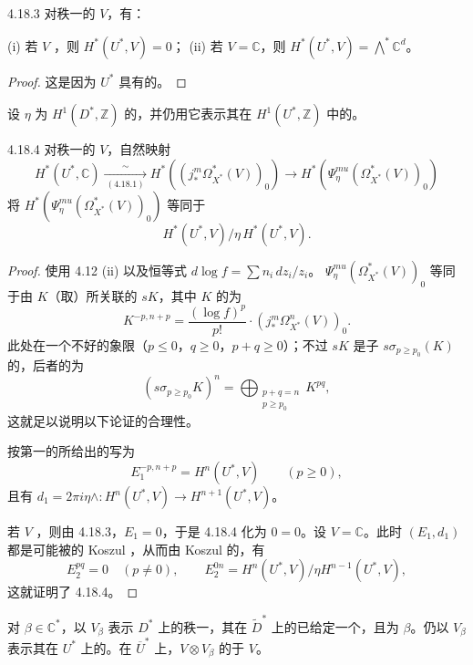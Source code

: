 \begin{SGAresult}{}{4.18.3}
对秩一的 $V$，有：

(i) 若 $V$ ，则 $H^*(U^*,V)=0$；
(ii) 若 $V=\mathbb C$，则 $H^*(U^*,V)=\bigwedge^*\mathbb C^d$。
\end{SGAresult}
\begin{proof}
这是因为 $U^*$ 具有的。
\end{proof}
设 $\eta$ 为 $H^1(D^*,\mathbb Z)$ 的，并仍用它表示其在 $H^1(U^*,\mathbb Z)$ 中的。

\begin{SGAresult}{}{4.18.4}
对秩一的 $V$，自然映射
\[
 H^*(U^*,\mathbb C)\xrightarrow[\ (4.18.1)\ ]{\sim}
 H^*((j_*^m\Omega_{X^*}^*(V))_0)
 \longrightarrow H^*(\Psi_\eta^{mu}(\Omega_{X^*}^*(V))_0)
\]
将 $H^*(\Psi_\eta^{mu}(\Omega_{X^*}^*(V))_0)$ 等同于
\[
 H^*(U^*,V)/\eta\,H^*(U^*,V).
\]
\end{SGAresult}
\begin{proof}
使用 4.12 (ii) 以及恒等式 $d\log f=\sum n_i\,dz_i/z_i$。 $\Psi_\eta^{mu}(\Omega_{X^*}^*(V))_0$ 等同于由 $K$（取）所关联的 $sK$，其中 $K$ 的为
\[
 K^{-p,n+p}=\frac{(\log f)^p}{p!}\cdot(j_*^m\Omega_{X^*}^n(V))_0.
\]
此处在一个不好的象限（$p\leq0$，$q\geq0$，$p+q\geq0$）；不过 $sK$ 是子 $s\sigma_{p\geq p_0}(K)$ 的，后者的为
\[
 (s\sigma_{p\geq p_0}K)^n=\bigoplus_{\substack{p+q=n\\p\geq p_0}}K^{pq},
\]
这就足以说明以下论证的合理性。

按第一的所给出的写为
\[
 E_1^{-p,n+p}=H^n(U^*,V)\qquad(p\geq0),
\]
且有 $d_1=2\pi i\eta\wedge:H^n(U^*,V)\to H^{n+1}(U^*,V)$。

若 $V$ ，则由 4.18.3，$E_1=0$，于是 4.18.4 化为 $0=0$。设 $V=\mathbb C$。此时 $(E_1,d_1)$ 都是可能被的 Koszul ，从而由 Koszul 的，有
\[
 E_2^{pq}=0\quad(p\neq0),\qquad
 E_2^{0n}=H^n(U^*,V)/\eta H^{n-1}(U^*,V),
\]
这就证明了 4.18.4。
\end{proof}

对 $\beta\in\mathbb C^*$，以 $V_\beta$ 表示 $D^*$ 上的秩一，其在 $\widetilde D^*$ 上的已给定一个，且为 $\beta$。仍以 $V_\beta$ 表示其在 $U^*$ 上的。在 $\overline U^*$ 上，$V\otimes V_\beta$ 的于 $V$。

